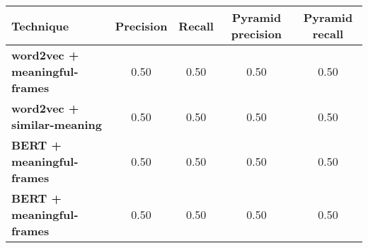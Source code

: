 \begin{table}[H]
\centering    
\begin{small}
\begin{threeparttable}
\begin{tabular}{lcccc}


\textbf{Technique} & 
\textbf{Precision} & \textbf{Recall} & 
\parbox[c][.9cm][c]{1.5cm}{\centering \textbf{Pyramid precision}} & 
\parbox[c][.9cm][c]{1.5cm}{\centering \textbf{Pyramid recall}} \\


\hline


\textbf{word2vec + meaningful-frames} &
0.50 & 0.50 & 
0.50 & 0.50 
\\

\textbf{word2vec + similar-meaning} &
0.50 & 0.50 & 
0.50 & 0.50 
\\


\textbf{BERT + meaningful-frames} &
0.50 & 0.50 & 
0.50 & 0.50 
\\

\textbf{BERT + meaningful-frames} &
0.50 & 0.50 & 
0.50 & 0.50 
\\

\hline

\end{tabular}
\end{threeparttable}
\end{small}
\caption{}
\end{table}

